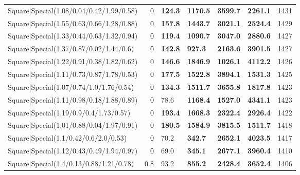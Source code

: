\begin{tabular}{lrllllr}
 Square|Special(1.08/0.04/0.42/1.99/0.58)                      &             0   & \textbf{124.3} & \textbf{1170.5} & \textbf{3599.7} & \textbf{2261.1} &         1431 \\
 Square|Special(1.55/0.63/0.66/1.28/0.88)                      &             0   & \textbf{157.8} & \textbf{1443.7} & \textbf{3021.1} & \textbf{2524.4} &         1429 \\
 Square|Special(1.33/0.44/0.63/1.32/0.94)                      &             0   & \textbf{119.4} & \textbf{1090.7} & \textbf{3047.0} & \textbf{2880.6} &         1427 \\
 Square|Special(1.37/0.87/0.02/1.44/0.6)                       &             0   & \textbf{142.8} & \textbf{927.3}  & \textbf{2163.6} & \textbf{3901.5} &         1427 \\
 Square|Special(1.22/0.91/0.38/1.82/0.62)                      &             0   & \textbf{146.6} & \textbf{1846.9} & \textbf{1026.1} & \textbf{4112.2} &         1426 \\
 Square|Special(1.11/0.73/0.87/1.78/0.53)                      &             0   & \textbf{177.5} & \textbf{1522.8} & \textbf{3894.1} & \textbf{1531.3} &         1425 \\
 Square|Special(1.07/0.74/1.0/1.76/0.54)                       &             0   & \textbf{134.3} & \textbf{1511.7} & \textbf{3655.8} & \textbf{1817.8} &         1423 \\
 Square|Special(1.11/0.98/0.18/1.88/0.89)                      &             0   & 78.6           & \textbf{1168.4} & \textbf{1527.0} & \textbf{4341.1} &         1423 \\
 Square|Special(1.19/0.9/0.4/1.73/0.57)                        &             0   & \textbf{193.4} & \textbf{1668.3} & \textbf{2322.4} & \textbf{2926.4} &         1422 \\
 Square|Special(1.01/0.88/0.04/1.97/0.91)                      &             0   & \textbf{180.5} & \textbf{1584.9} & \textbf{3815.5} & \textbf{1511.7} &         1418 \\
 Square|Special(1.1/0.42/0.6/2.0/0.53)                         &             0   & 70.2           & \textbf{342.7}  & \textbf{2652.1} & \textbf{4023.5} &         1417 \\
 Square|Special(1.12/0.43/0.49/1.94/0.97)                      &             0   & 69.0           & \textbf{345.1}  & \textbf{2677.1} & \textbf{3960.4} &         1410 \\
 Square|Special(1.4/0.13/0.88/1.21/0.78)                       &             0.8 & 93.2           & \textbf{855.2}  & \textbf{2428.4} & \textbf{3652.4} &         1406 \\

\end{tabular}
